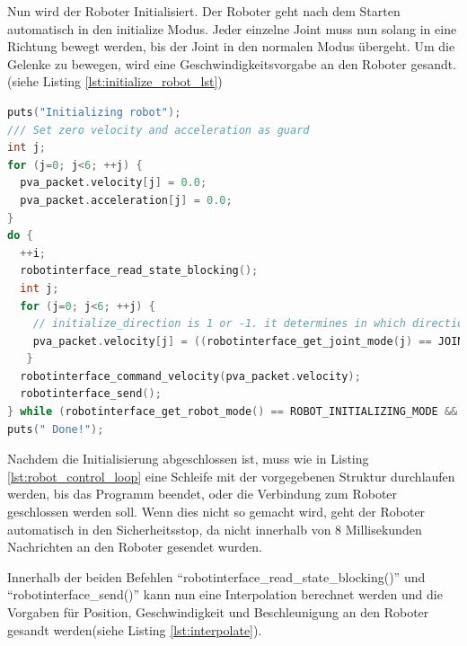 Nun wird der Roboter Initialisiert. Der Roboter geht nach dem Starten automatisch in den initialize Modus. Jeder einzelne Joint muss nun solang in eine Richtung bewegt werden, bis der Joint in den normalen Modus übergeht. Um die Gelenke zu bewegen, wird eine Geschwindigkeitsvorgabe an den Roboter gesandt.(siehe Listing \ref{lst:initialize_robot_lst})

\begin{lstlisting}[language=C,caption={Initialisierung der einzelnen Gelenke}, label=lst:initialize_robot_lst,captionpos=b]
puts("Initializing robot");
/// Set zero velocity and acceleration as guard
int j;
for (j=0; j<6; ++j) {
  pva_packet.velocity[j] = 0.0;
  pva_packet.acceleration[j] = 0.0;
}
do {
  ++i;
  robotinterface_read_state_blocking();
  int j;
  for (j=0; j<6; ++j) {
    // initialize_direction is 1 or -1. it determines in which direction die Joint is moving during the initialization
    pva_packet.velocity[j] = ((robotinterface_get_joint_mode(j) == JOINT_INITIALISATION_MODE)) ? (initialize_direction)* 0.1 : 0.0;
   }
  robotinterface_command_velocity(pva_packet.velocity);
  robotinterface_send();
} while (robotinterface_get_robot_mode() == ROBOT_INITIALIZING_MODE && exit_flag == false);
puts(" Done!");
\end{lstlisting}

Nachdem die Initialisierung abgeschlossen ist, muss wie in Listing \ref{lst:robot_control_loop} eine Schleife mit der vorgegebenen Struktur durchlaufen werden, bis das Programm beendet, oder die Verbindung zum Roboter geschlossen werden soll. Wenn dies nicht so gemacht wird, geht der Roboter automatisch in den Sicherheitsstop, da nicht innerhalb von 8 Millisekunden Nachrichten an den Roboter gesendet wurden.

Innerhalb der beiden Befehlen ``robotinterface\_read\_state\_blocking()'' und ``robotinterface\_send()'' kann nun eine Interpolation berechnet werden und die Vorgaben für Position, Geschwindigkeit und Beschleunigung an den Roboter gesandt werden(siehe Listing \ref{lst:interpolate}).

